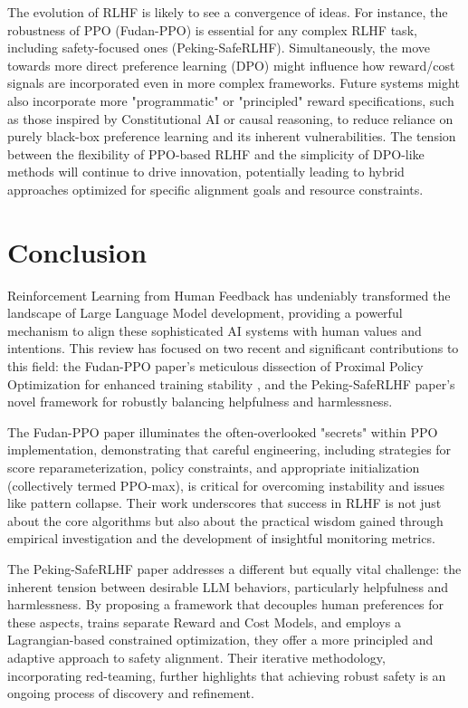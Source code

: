 \documentclass[10pt,journal,compsoc]{IEEEtran} %
\begin{document}
The evolution of RLHF is likely to see a convergence of ideas. For instance, the robustness of PPO (Fudan-PPO) is essential for any complex RLHF task, including safety-focused ones (Peking-SafeRLHF). Simultaneously, the move towards more direct preference learning (DPO) might influence how reward/cost signals are incorporated even in more complex frameworks. Future systems might also incorporate more "programmatic" or "principled" reward specifications, such as those inspired by Constitutional AI or causal reasoning, to reduce reliance on purely black-box preference learning and its inherent vulnerabilities. The tension between the flexibility of PPO-based RLHF and the simplicity of DPO-like methods will continue to drive innovation, potentially leading to hybrid approaches optimized for specific alignment goals and resource constraints.

\section{Conclusion}
\label{sec:conclusion}

Reinforcement Learning from Human Feedback has undeniably transformed the landscape of Large Language Model development, providing a powerful mechanism to align these sophisticated AI systems with human values and intentions. This review has focused on two recent and significant contributions to this field: the Fudan-PPO paper's meticulous dissection of Proximal Policy Optimization for enhanced training stability , and the Peking-SafeRLHF paper's novel framework for robustly balancing helpfulness and harmlessness.  

The Fudan-PPO paper illuminates the often-overlooked "secrets" within PPO implementation, demonstrating that careful engineering, including strategies for score reparameterization, policy constraints, and appropriate initialization (collectively termed PPO-max), is critical for overcoming instability and issues like pattern collapse. Their work underscores that success in RLHF is not just about the core algorithms but also about the practical wisdom gained through empirical investigation and the development of insightful monitoring metrics.

The Peking-SafeRLHF paper addresses a different but equally vital challenge: the inherent tension between desirable LLM behaviors, particularly helpfulness and harmlessness. By proposing a framework that decouples human preferences for these aspects, trains separate Reward and Cost Models, and employs a Lagrangian-based constrained optimization, they offer a more principled and adaptive approach to safety alignment. Their iterative methodology, incorporating red-teaming, further highlights that achieving robust safety is an ongoing process of discovery and refinement.
\end{document}
